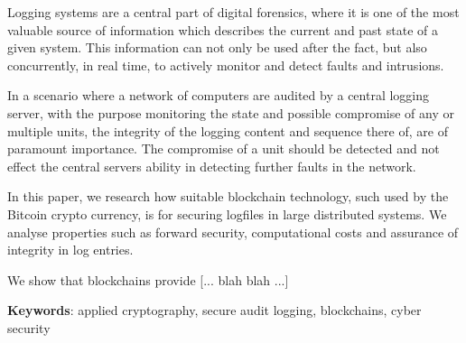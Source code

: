 
Logging systems are a central part of digital forensics, where it
is one of the most valuable source of information which describes
the current and past state of a given system. This information
can not only be used after the fact, but also concurrently, in
real time, to actively monitor and detect faults and intrusions.

In a scenario where a network of computers are audited by a
central logging server, with the purpose monitoring the state and
possible compromise of any or multiple units, the integrity of
the logging content and sequence there of, are of paramount
importance. The compromise of a unit should be detected and not
effect the central servers ability in detecting further faults
in the network.

In this paper, we research how suitable blockchain technology,
such used by the Bitcoin crypto currency, is for securing
logfiles in large distributed systems. We analyse properties such
as forward security, computational costs and assurance of
integrity in log entries.

We show that blockchains provide [... blah blah ...]

\textbf{Keywords}: applied cryptography, secure audit logging,
blockchains, cyber security

